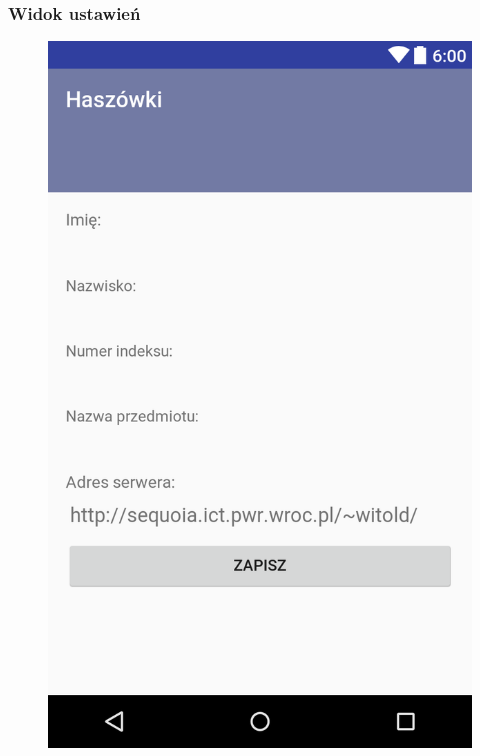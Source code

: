 \documentclass{beamer}
\begin{document}
  \begin{frame}
	\frametitle{Widok ustawień}
	\begin{center}
		\begin{figure}[ht]
			\centering
			\includegraphics[scale=0.15]{layout-2016-11-29-223623.png}
		\end{figure}
	\end{center}
  \end{frame}
\end{document}
